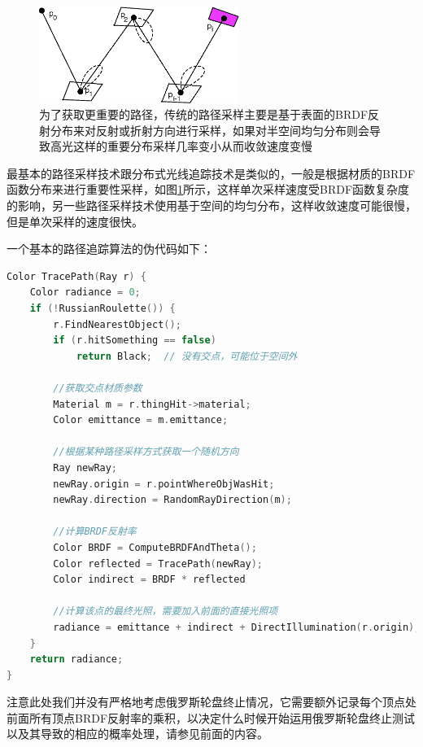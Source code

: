 \begin{figure}
\sidecaption
	\includegraphics[width=0.58\textwidth]{figures/pt/path-tracing}
	\caption{为了获取更重要的路径，传统的路径采样主要是基于表面的BRDF反射分布来对反射或折射方向进行采样，如果对半空间均匀分布则会导致高光这样的重要分布采样几率变小从而收敛速度变慢}
	\label{f:pt-path-sampling}
\end{figure}

最基本的路径采样技术跟分布式光线追踪技术是类似的，一般是根据材质的BRDF函数分布来进行重要性采样，如图\ref{f:pt-path-sampling}所示，这样单次采样速度受BRDF函数复杂度的影响，另一些路径采样技术使用基于空间的均匀分布，这样收敛速度可能很慢，但是单次采样的速度很快。

一个基本的路径追踪算法的伪代码如下：

\begin{lstlisting}[language=C++]
Color TracePath(Ray r) {
	Color radiance = 0;
	if (!RussianRoulette()) {
    	r.FindNearestObject();
    	if (r.hitSomething == false) 
      		return Black;  // 没有交点，可能位于空间外

		//获取交点材质参数
    	Material m = r.thingHit->material;
    	Color emittance = m.emittance;

    	//根据某种路径采样方式获取一个随机方向
    	Ray newRay;
    	newRay.origin = r.pointWhereObjWasHit;
    	newRay.direction = RandomRayDirection(m);

    	//计算BRDF反射率
    	Color BRDF = ComputeBRDFAndTheta();
    	Color reflected = TracePath(newRay);
    	Color indirect = BRDF * reflected

    	//计算该点的最终光照，需要加入前面的直接光照项
    	radiance = emittance + indirect + DirectIllumination(r.origin);
    }
	return radiance;
}
\end{lstlisting}

注意此处我们并没有严格地考虑俄罗斯轮盘终止情况，它需要额外记录每个顶点处前面所有顶点BRDF反射率的乘积，以决定什么时候开始运用俄罗斯轮盘终止测试以及其导致的相应的概率处理，请参见前面的内容。







